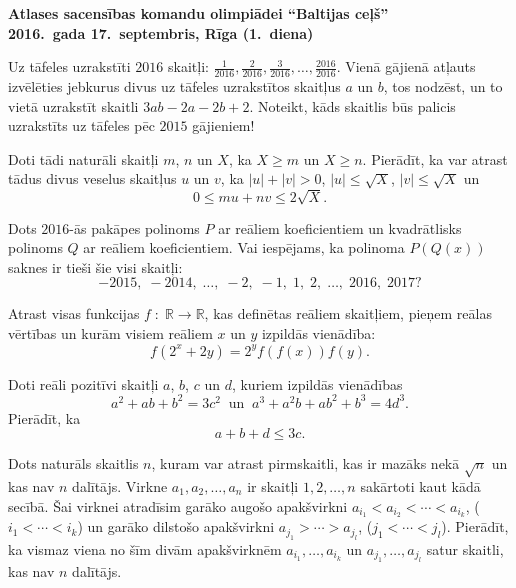 \documentclass[11pt]{article}
\begin{document}
\begin{center}
{\Large \bf Atlases sacensības komandu olimpiādei ``Baltijas ceļš''}\\
{\bf 2016.\ gada 17.\ septembris, Rīga (1.\ diena)}
\end{center}


\begin{problem}[BW.TST.2016.1]
Uz tāfeles uzrakstīti $2016$ skaitļi: $\frac{1}{2016},\frac{2}{2016},\frac{3}{2016},\ldots,\frac{2016}{2016}$. 
Vienā gājienā atļauts izvēlēties jebkurus divus uz tāfeles uzrakstītos skaitļus $a$ un $b$, tos nodzēst, 
un to vietā uzrakstīt skaitli $3ab - 2a - 2b + 2$. Noteikt, 
kāds skaitlis būs palicis uzrakstīts uz tāfeles pēc $2015$ gājieniem!
\end{problem}

\begin{problem}[BW.TST.2016.2]
Doti tādi naturāli skaitļi $m$, $n$ un $X$, ka $X \geq m$ un $X \geq n$. Pierādīt, ka var atrast
tādus divus veselus skaitļus $u$ un $v$, ka $|u| + |v| > 0$, $|u| \leq \sqrt{X}$, $|v| \leq \sqrt{X}$ un 
\[ 0 \leq mu  + nv \leq 2\sqrt{X}. \]
\end{problem}

\begin{problem}[BW.TST.2016.3]
Dots $2016$-ās pakāpes polinoms $P$ ar reāliem koeficientiem un 
kvadrātlisks polinoms $Q$ ar reāliem koeficientiem. Vai iespējams, ka 
polinoma $P(Q(x))$ saknes ir tieši šie visi skaitļi:
\[ -2015,\;-2014,\;\ldots,\;-2,\;-1,\;1,\;2,\;\ldots,\;2016,\;2017? \]
\end{problem}

\begin{problem}[BW.TST.2016.4]
Atrast visas funkcijas $f\;:\;\mathbb{R} \rightarrow \mathbb{R}$, kas definētas 
reāliem skaitļiem, pieņem reālas vērtības un kurām visiem reāliem $x$ un $y$ izpildās 
vienādība: 
\[ f\left( 2^x + 2y \right)  = 2^y f(f(x))f(y). \]
\end{problem}


\begin{problem}[BW.TST.2016.5]
Doti reāli pozitīvi skaitļi $a$, $b$, $c$ un $d$, kuriem izpildās vienādības 
\[ a^2 + ab + b^2 = 3c^2 \;\; \mbox{un} \;\; a^3 + a^2b + ab^2 + b^3 = 4d^3. \]
Pierādīt, ka 
\[ a + b + d \leq 3c. \]
\end{problem}

\begin{problem}[BW.TST.2016.6]
Dots naturāls skaitlis $n$, kuram var atrast pirmskaitli, kas ir mazāks nekā 
$\sqrt{n}$ un kas nav $n$ dalītājs. Virkne 
$a_1,a_2,\ldots,a_n$ ir skaitļi $1,2,\ldots,n$ sakārtoti kaut kādā secībā. 
Šai virknei atradīsim garāko augošo apakšvirkni $a_{i_1} < a_{i_2} < \cdots < a_{i_k}$, 
($i_1 < \cdots < i_k$) un garāko dilstošo apakšvirkni 
$a_{j_1} > \cdots > a_{j_l}$, ($j_1 < \cdots < j_l$). 
Pierādīt, ka vismaz viena no šīm divām apakšvirknēm 
$a_{i_1},\ldots,a_{i_k}$ un $a_{j_1},\ldots,a_{j_l}$ satur skaitli, kas nav $n$ dalītājs.  
\end{problem}
\end{document}
